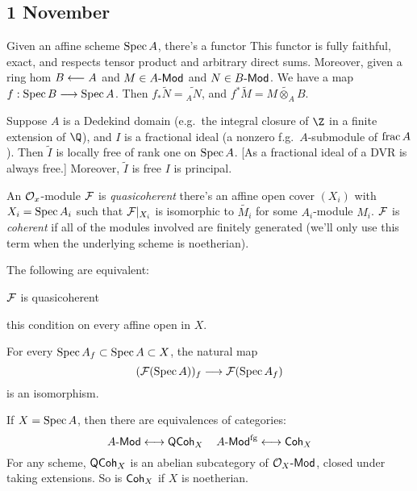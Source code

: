 \documentclass[11pt]{article}
\begin{document}
\begin{Nov1}
\section*{1 November}
Given an affine scheme $\operatorname{Spec} A$, there's a functor
This functor is fully faithful, exact, and respects tensor product and arbitrary direct sums. Moreover, given a ring hom $B\longleftarrow A$ and $M\in A\operatorname{{\mathsf{\!-Mod}}}$ and $N\in B\operatorname{{\mathsf{\!-Mod}}}$. We have a map $f:\operatorname{Spec} B\longrightarrow\operatorname{Spec} A$. Then $f_*\widetilde N=\widetilde{_AN}$, and $f^*\widetilde M=\widetilde{M\otimes_AB}$.
\begin{exmp*}
Suppose $A$ is a Dedekind domain (e.g.\ the integral closure of $\Z$ in a finite extension of $\Q$), and $I$ is a fractional ideal (a nonzero f.g.\ $A$-submodule of $\operatorname{frac} A$). Then $\widetilde I$ is locally free of rank one on $\operatorname{Spec} A$. [As a fractional ideal of a DVR is always free.]  Moreover, $\widetilde I$ is free \Iff $I$ is principal.
\end{exmp*}
\begin{defn*}
An $\mathcal{O}_x$-module $\mathcal{F}$ is \emph{quasicoherent} \Iff there's an affine open cover $(X_i)$ with $X_i=\operatorname{Spec} A_i$ such that $\mathcal{F}|_{X_i}$ is isomorphic to $\widetilde {M_i}$ for some $A_i$-module $M_i$. $\mathcal{F}$ is \emph{coherent} if all of the modules involved are finitely generated (we'll only use this term when the underlying scheme is noetherian).
\end{defn*}
\begin{prop*}
The following are equivalent:
\begin{itemise}
\item $\mathcal{F}$ is quasicoherent
\item this condition on every affine open in $X$.
\item For every $\operatorname{Spec} A_f\subset\operatorname{Spec} A\subset X$, the natural map
\[(\mathcal{F}(\operatorname{Spec} A))_f\longrightarrow\mathcal{F}(\operatorname{Spec} A_f)\]
is an isomorphism.
\end{itemise}
\end{prop*}
\begin{exmp*}
If $X=\operatorname{Spec} A$, then there are equivalences of categories:
\[A\Modules\longleftrightarrow\QuasiCoherent_X\ \ \ A\fgModules\longleftrightarrow\Coherent_X\]
For any scheme, $\operatorname{{\mathsf{QCoh}}}_X$ is an abelian subcategory of $\mathcal{O}_X\operatorname{{\mathsf{\!-Mod}}}$, closed under taking extensions. So is $\operatorname{{\mathsf{Coh}}}_X$ if $X$ is noetherian.
\end{exmp*}
\begin{exmp*}

\end{exmp*}
\end{Nov1}
\end{document}
